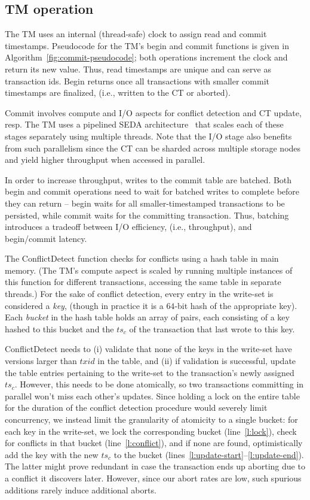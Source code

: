 \subsection{TM operation}
\label{ssec:server-side}

The TM uses an internal (thread-safe) clock to assign read and commit timestamps.
Pseudocode for the TM's begin and commit functions is given in Algorithm~\ref{fig:commit-pseudocode}; both  
operations increment the clock and return its new value. 
Thus, read timestamps are unique and can serve as transaction ids. Begin returns once all transactions with smaller commit timestamps are finalized, 
(i.e., written to the CT or aborted).

Commit involves {compute} and  {I/O} aspects for conflict detection and CT update, resp.
The TM uses a pipelined SEDA architecture~\cite{SEDAPhDThesis} that 
scales each of these stages separately using multiple threads.
Note that the I/O stage also benefits from such parallelism since the 
CT can be sharded across multiple storage nodes and yield higher throughput when accessed in parallel.

In order to increase throughput, writes to the commit table are batched. Both begin and commit operations need to wait for batched writes to complete before they can return -- begin waits for all smaller-timestamped transactions to be persisted, while commit waits for the committing transaction.
Thus, batching introduces a tradeoff between I/O efficiency, (i.e., throughput), and begin/commit latency.

The {\sc ConflictDetect}
function checks for conflicts using a hash table in main memory.  (The TM's compute aspect is scaled by running multiple instances of this function for different transactions, accessing the same table in separate threads.)
For the sake of conflict detection, every entry in the write-set is considered a \emph{key}, 
(though in practice it is a $64$-bit hash of the appropriate key). 
Each \emph{bucket} in the hash table holds an array of pairs, each consisting of a key hashed to this bucket 
and  the $ts_c$  of the transaction that last wrote to this key.

{\sc ConflictDetect} needs to (i) validate that none of the keys in the write-set have versions larger than $txid$ in the table, and (ii) if validation is successful, update the  table entries pertaining to the write-set to the transaction's newly assigned $ts_c$. However, this needs to be done atomically, so two transactions committing in parallel won't miss each other's updates. 
Since holding a lock on the entire table 
for the duration of the conflict detection procedure would severely limit concurrency, we instead limit the granularity of atomicity to a single bucket: for each key in the write-set, we lock the corresponding bucket (line~\ref{l:lock}), 
check for conflicts in that bucket
(line~\ref{l:conflict}), and if none are found, optimistically add the key with the new $ts_c$ to the bucket (lines~\ref{l:update-start}--\ref{l:update-end}). The latter might prove redundant in case the transaction ends up aborting due to a conflict it discovers later. However, since our abort rates are low, such spurious additions rarely induce additional aborts.

